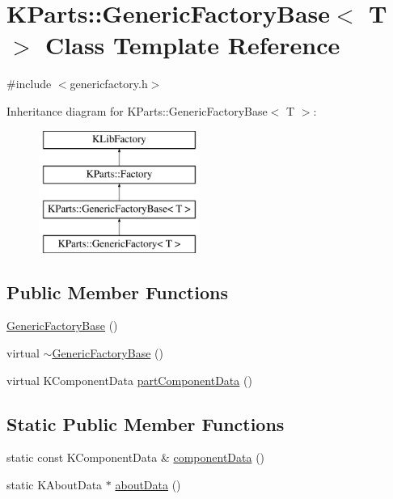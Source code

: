 \hypertarget{classKParts_1_1GenericFactoryBase}{\section{K\+Parts\+:\+:Generic\+Factory\+Base$<$ T $>$ Class Template Reference}
\label{classKParts_1_1GenericFactoryBase}
}


{\ttfamily \#include $<$genericfactory.\+h$>$}

Inheritance diagram for K\+Parts\+:\+:Generic\+Factory\+Base$<$ T $>$\+:\begin{figure}[H]
\begin{center}
\leavevmode
\includegraphics[height=4.000000cm]{classKParts_1_1GenericFactoryBase}
\end{center}
\end{figure}
\subsection*{Public Member Functions}
\begin{DoxyCompactItemize}
\item 
\hyperlink{classKParts_1_1GenericFactoryBase_af55233417c6cfae4f515ffe332987261}{Generic\+Factory\+Base} ()
\item 
virtual \hyperlink{classKParts_1_1GenericFactoryBase_a684bf9bd99f8c86d64a1fbdac6ee2901}{$\sim$\+Generic\+Factory\+Base} ()
\item 
virtual K\+Component\+Data \hyperlink{classKParts_1_1GenericFactoryBase_a0b1d32c7adf2255890bdd3898757feae}{part\+Component\+Data} ()
\end{DoxyCompactItemize}
\subsection*{Static Public Member Functions}
\begin{DoxyCompactItemize}
\item 
static const K\+Component\+Data \& \hyperlink{classKParts_1_1GenericFactoryBase_ad4a0ca70dec2fe8f4e0d4293e17eb776}{component\+Data} ()
\item 
static K\+About\+Data $\ast$ \hyperlink{classKParts_1_1GenericFactoryBase_ad5b89e87d73a76f3548c1afd09858020}{about\+Data} ()
\end{DoxyCompactItemize}
